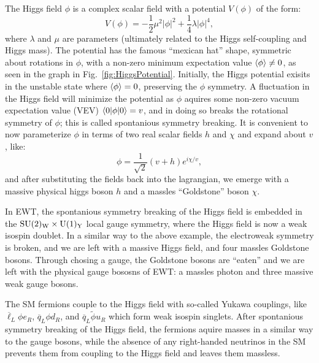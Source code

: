 The Higgs field $\phi$ is a complex scalar field with a potential $V(\phi)$ of the form:
\begin{equation}
    V(\phi) = -\frac{1}{2}\mu^2|\phi|^2 + \frac{1}{4}\lambda|\phi|^4,
\end{equation}
where $\lambda$ and $\mu$ are parameters (ultimately related to the Higgs self-coupling and Higgs mass). The potential has the famous ``mexican hat'' shape, symmetric about rotations in $\phi$, with a non-zero minimum expectation value $\braket{\phi} \neq 0$, as seen in the graph in Fig.~\ref{fig:HiggsPotential}. Initially, the Higgs potential exisits in the unstable state where $\braket{\phi} = 0$, preserving the $\phi$ symmetry. A fluctuation in the Higgs field will minimize the potential as $\phi$ aquires some non-zero vacuum expectation value (VEV) $\braket{0|\phi|0} = v$, and in doing so breaks the rotational symmetry of $\phi$; this is called spontanious symmetry breaking. It is convenient to now parameterize $\phi$ in terms of two real scalar fields $h$ and $\chi$ and expand about $v$, like:
\begin{equation}
    \phi = \frac{1}{\sqrt{2}}(v+h)e^{i\chi/v},
\end{equation}
and after substituting the fields back into the lagrangian, we emerge with a massive physical higgs boson $h$ and a massles ``Goldstone'' boson $\chi$.

In EWT, the spontanious symmetry breaking of the Higgs field is embedded in the $\mathrm{SU(2)_{W}}\times\mathrm{U(1)_{Y}}$ local gauge symmetry, where the Higgs field is now a weak isospin doublet. In a similar way to the above example, the electroweak symmetry is broken, and we are left with a massive Higgs field, and four massles Goldstone bosons. Through chosing a gauge, the Goldstone bosons are ``eaten'' and we are left with the physical gauge bososns of EWT: a massles photon and three massive weak gauge bosons. 

The SM fermions couple to the Higgs field with so-called Yukawa couplings, like $\overline{\ell}_L\phi e_R$, $\overline{q}_L\phi d_R$, and $\overline{q}_L\tilde{\phi}u_R$ which form weak isospin singlets. After spontanious symmetry breaking of the Higgs field, the fermions aquire masses in a similar way to the gauge bosons, while the absence of any right-handed neutrinos in the SM prevents them from coupling to the Higgs field and leaves them massless.

